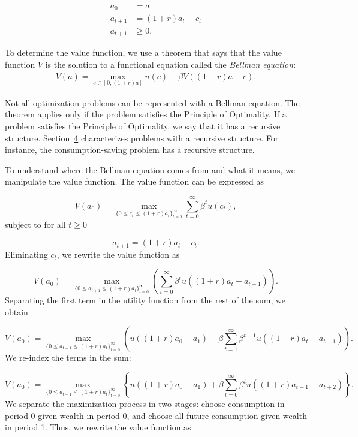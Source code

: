 \documentclass{article}
\begin{document}
\[
\begin{align*}
a_{0}&= a\\
a_{t+1}&=(1+r) a_t-c_t\\
a_{t+1}&\ge 0.
\end{align*}
\]

To determine the value function, we use a theorem that says that the value function $V$ is the solution to a functional equation called the \textit{Bellman equation}:
\wcSpan*[id=equation-7]{}
\setcounter{tpequation}{6}\label{e:recur}
\[
\begin{align*}
V(a)=\max_{c\in[0,(1+r) a]} u(c)+\beta V((1+r) a-c).\tag{7}
\end{align*}
\]

Not all optimization problems can be represented with a Bellman equation. The theorem applies only if the problem satisfies the Principle of Optimality. If a problem satisfies the Principle of Optimality, we say that it has a recursive structure. Section~\href{theory.tex#ref-sec-theory}{4} characterizes problems with a recursive structure. For instance, the consumption-saving problem has a recursive structure.

To understand where the Bellman equation comes from and what it means, we manipulate the value function. The value function can be expressed as

\[
V(a_0) = \max_{\lbrace 0\le c_t\le (1+r) a_t\rbrace _{t=0}^{\infty}} \sum_{t=0}^{\infty}\beta^t u(c_t),
\]
subject to for all $t\ge 0$

\[
a_{t+1} = (1+r) a_t-c_t.
\]
Eliminating $c_t$, we rewrite the value function as

\[
V(a_0)=\max_{\lbrace 0\le a_{t+1}\le (1+r) a_t\rbrace _{t=0}^{\infty}}\left(\sum_{t=0}^{\infty}\beta^t u((1+r) a_t-a_{t+1})\right).
\]
Separating the first term in the utility function from the rest of the sum, we obtain

\[
V(a_0)=\max_{\lbrace 0\le a_{t+1}\le (1+r) a_t\rbrace _{t=0}^{\infty}}\left(u((1+r) a_0-a_1)+\beta \sum_{t=1}^{\infty}\beta^{t-1} u((1+r) a_t-a_{t+1})\right).
\]
We re-index the terms in the sum:

\[
V(a_0) = \max_{\lbrace 0\le a_{t+1}\le (1+r) a_t\rbrace _{t=0}^{\infty}} \left\lbrace u((1+r) a_0-a_1)+\beta \sum_{t=0}^{\infty}\beta^{t} u((1+r) a_{t+1}-a_{t+2})\right\rbrace .
\]
We separate the maximization process in two stages: choose consumption in period 0 given wealth in period 0, and choose all future consumption given wealth in period 1. Thus, we rewrite the value function as
\end{document}
